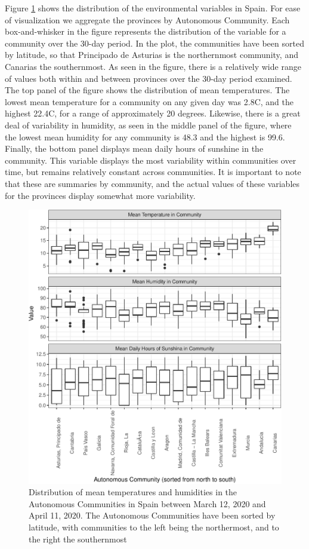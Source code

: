 \documentclass[]{elsarticle} %
\makeatletter
\def\maxwidth{\ifdim\Gin@nat@width>\linewidth\linewidth
\else\Gin@nat@width\fi}
\let\Oldincludegraphics\includegraphics
\renewcommand{\includegraphics}[1]{\Oldincludegraphics[width=\maxwidth]{#1}}
\makeatother
\begin{document}
Figure \ref{fig:descriptives-temperature} shows the distribution of the
environmental variables in Spain. For ease of visualization we aggregate
the provinces by Autonomous Community. Each box-and-whisker in the
figure represents the distribution of the variable for a community over
the 30-day period. In the plot, the communities have been sorted by
latitude, so that Principado de Asturias is the northernmost community,
and Canarias the southernmost. As seen in the figure, there is a
relatively wide range of values both within and between provinces over
the 30-day period examined. The top panel of the figure shows the
distribution of mean temperatures. The lowest mean temperature for a
community on any given day was 2.8C, and the highest 22.4C, for a range
of approximately 20 degrees. Likewise, there is a great deal of
variability in humidity, as seen in the middle panel of the figure,
where the lowest mean humidity for any community is 48.3 and the highest
is 99.6. Finally, the bottom panel displays mean daily hours of sunshine
in the community. This variable displays the most variability within
communities over time, but remains relatively constant across
communities. It is important to note that these are summaries by
community, and the actual values of these variables for the provinces
display somewhat more variability.

\begin{figure}
\centering
\includegraphics{Environmental-Correlates-of-COVID19-Spain_files/figure-latex/descriptives-temperature-1.pdf}
\caption{\label{fig:descriptives-temperature} Distribution of mean
temperatures and humidities in the Autonomous Communities in Spain
between March 12, 2020 and April 11, 2020. The Autonomous Communities
have been sorted by latitude, with communities to the left being the
northermost, and to the right the southernmost}
\end{figure}
\end{document}
